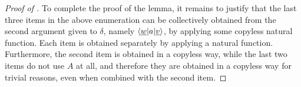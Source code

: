 \begin{proof}[Proof of ]
     To complete the proof of the lemma, it remains to justify that the last three items in the above enumeration can be collectively obtained from the second argument given to $\delta$, namely $\langle \underline w|a|\underline v \rangle$, by applying some copyless natural function. Each item is obtained separately by applying a natural function. Furthermore, the second item is obtained in a copyless way, while the last two items do not use $A$ at all, and therefore they are obtained in a copyless way for trivial reasons, even when combined with the second item.
\end{proof}


